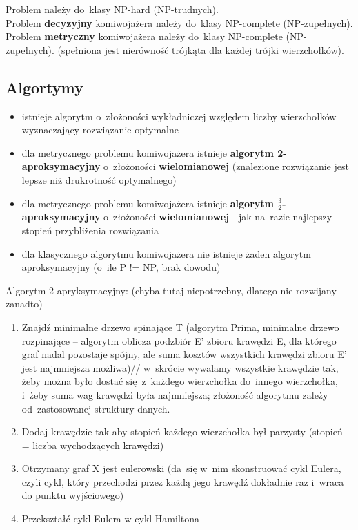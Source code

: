 \noindent Problem należy do~klasy NP-hard (NP-trudnych).\\
Problem \textbf{decyzyjny} komiwojażera należy do~klasy NP-complete (NP-zupełnych).\\
Problem \textbf{metryczny} komiwojażera należy do~klasy NP-complete (NP-zupełnych). (spełniona jest nierówność trójkąta dla każdej trójki wierzchołków).\\

\subsection{Algortymy}
\begin{itemize}
 \item istnieje algorytm o~złożoności wykładniczej względem liczby wierzchołków wyznaczający rozwiązanie optymalne
 \item dla metrycznego problemu komiwojażera istnieje \textbf{algorytm 2-aproksymacyjny} o~złożoności \textbf{wielomianowej} (znalezione rozwiązanie jest lepsze niż drukrotność optymalnego)
 \item dla metrycznego problemu komiwojażera istnieje \textbf{algorytm $\frac{3}{2}$-aproksymacyjny} o~złożoności \textbf{wielomianowej} - jak na~razie najlepszy stopień przybliżenia rozwiązania
 \item dla klasycznego algorytmu komiwojażera nie istnieje żaden algorytm aproksymacyjny (o~ile P != NP, brak dowodu)
\end{itemize}

Algorytm 2-apryksymacyjny: (chyba tutaj niepotrzebny, dlatego nie rozwijany zanadto)
\begin{enumerate}
 \item Znajdź minimalne drzewo spinające T (algorytm Prima, minimalne drzewo rozpinające -- algorytm oblicza podzbiór E' zbioru krawędzi E, dla którego graf nadal pozostaje spójny, ale suma kosztów wszystkich krawędzi zbioru E' jest najmniejsza możliwa)//
 w~skrócie wywalamy wszystkie krawędzie tak, żeby można było dostać się~z~każdego wierzchołka do~innego wierzchołka, i~żeby suma wag krawędzi była najmniejsza; złożoność algorytmu zależy od~zastosowanej struktury danych.
 \item Dodaj krawędzie tak aby stopień każdego wierzchołka był parzysty (stopień = liczba wychodzących krawędzi)
 \item Otrzymany graf  X jest eulerowski (da~się w~nim skonstruować cykl Eulera, czyli cykl, który przechodzi przez każdą jego krawędź dokładnie raz i~wraca do punktu wyjściowego)
 \item Przekształć cykl Eulera w cykl Hamiltona
\end{enumerate}






